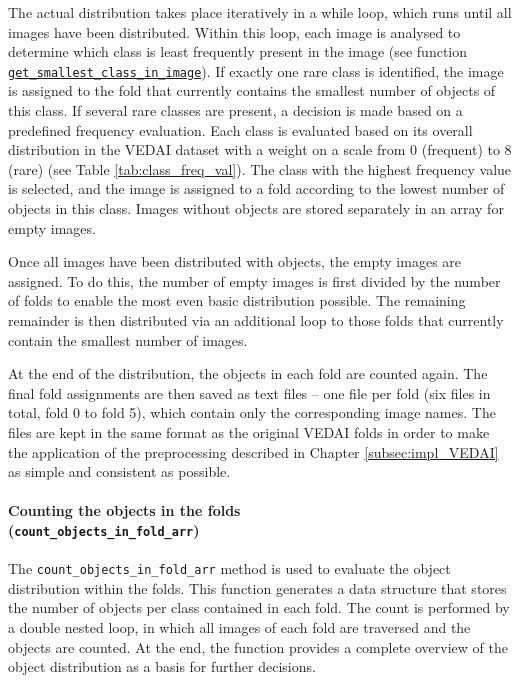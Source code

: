 The actual distribution takes place iteratively in a while loop, which runs until all images have been distributed. Within this loop, each image is analysed to determine which class is least frequently present in the image (see function \hyperlink{par:get_smallest_class_in_image}{\lstinline|get_smallest_class_in_image|}). If exactly one rare class is identified, the image is assigned to the fold that currently contains the smallest number of objects of this class. If several rare classes are present, a decision is made based on a predefined frequency evaluation. Each class is evaluated based on its overall distribution in the \acrshort{VEDAI} dataset with a weight on a scale from 0 (frequent) to 8 (rare) (see Table \ref{tab:class_freq_val}). The class with the highest frequency value is selected, and the image is assigned to a fold according to the lowest number of objects in this class. Images without objects are stored separately in an array for empty images.

Once all images have been distributed with objects, the empty images are assigned. To do this, the number of empty images is first divided by the number of folds to enable the most even basic distribution possible. The remaining remainder is then distributed via an additional loop to those folds that currently contain the smallest number of images.

At the end of the distribution, the objects in each fold are counted again. The final fold assignments are then saved as text files – one file per fold (six files in total, fold 0 to fold 5), which contain only the corresponding image names. The files are kept in the same format as the original \acrshort{VEDAI} folds in order to make the application of the preprocessing described in Chapter \ref{subsec:impl_VEDAI} as simple and consistent as possible.


\paragraph{Counting the objects in the folds \\ (\lstinline|count_objects_in_fold_arr|)}
\hypertarget{par:count_objects_in_fold_arr}{}

The \lstinline|count_objects_in_fold_arr| method is used to evaluate the object distribution within the folds. This function generates a data structure that stores the number of objects per class contained in each fold. The count is performed by a double nested loop, in which all images of each fold are traversed and the objects are counted. At the end, the function provides a complete overview of the object distribution as a basis for further decisions.



